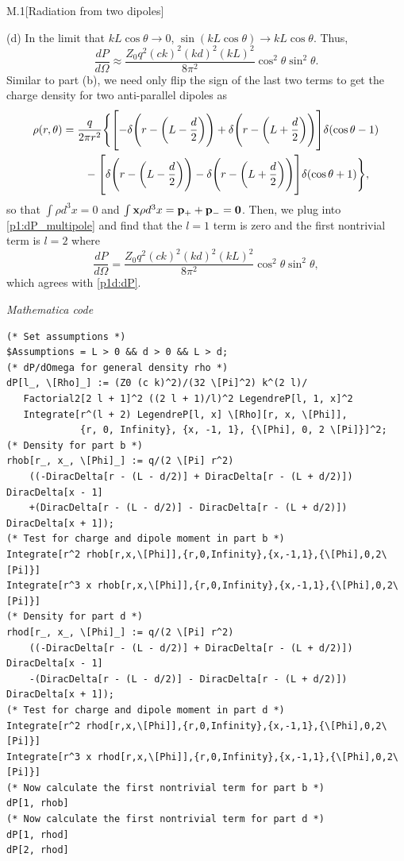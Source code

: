 \documentclass[12pt]{article}
\begin{document}
\begin{problem}{M.1}[Radiation from two dipoles]
\begin{solution}
(d) In the limit that $kL\cos\theta\to0$, $\sin(kL\cos\theta)\to kL\cos\theta$. 
Thus,
\begin{equation}\label{p1d:dP}
    \frac{dP}{d\Omega}\approx\frac{Z_0q^2(ck)^2(kd)^2(kL)^2}{8\pi^2}
    \cos^2\theta\sin^2\theta .
\end{equation}
Similar to part (b), we need only flip the sign of the last two terms to get 
the charge density for two anti-parallel dipoles as
\begin{align}
    \rho(r,\theta)
    &=\frac{q}{2\pi
    r^2}\Bigg\{\qty[-\delta\qty(r-\qty(L-\frac{d}{2}))+\delta\qty(r-\qty(L+\frac{d}{2}))]\delta\qty(\cos\theta-1)\notag\\
    &\qquad-\qty[\delta\qty(r-\qty(L-\frac{d}{2}))-\delta\qty(r-\qty(L+\frac{d}{2}))]\delta\qty(\cos\theta+1)\Bigg\},
\end{align}
so that $\int\rho d^3x=0$ and $\int\vb{x}\rho d^3x=\vb{p}_++\vb{p}_-=\vb{0}$.
Then, we plug into \cref{p1:dP_multipole} and find that the $l=1$ term is zero
and the first nontrivial term is $l=2$ where
\begin{equation}
    \frac{dP}{d\Omega}
    =\frac{Z_0q^2(ck)^2(kd)^2(kL)^2}{8\pi^2}\cos^2\theta\sin^2\theta, 
\end{equation}
which agrees with \cref{p1d:dP}.
\newpage
\begin{center}
    \textit{Mathematica code} 
\end{center}
\begin{lstlisting}[firstnumber=1]
(* Set assumptions *)
$Assumptions = L > 0 && d > 0 && L > d;
(* dP/dOmega for general density rho *)
dP[l_, \[Rho]_] := (Z0 (c k)^2)/(32 \[Pi]^2) k^(2 l)/
   Factorial2[2 l + 1]^2 ((2 l + 1)/l)^2 LegendreP[l, 1, x]^2
   Integrate[r^(l + 2) LegendreP[l, x] \[Rho][r, x, \[Phi]],
             {r, 0, Infinity}, {x, -1, 1}, {\[Phi], 0, 2 \[Pi]}]^2;
(* Density for part b *)
rhob[r_, x_, \[Phi]_] := q/(2 \[Pi] r^2)
    ((-DiracDelta[r - (L - d/2)] + DiracDelta[r - (L + d/2)]) DiracDelta[x - 1]
    +(DiracDelta[r - (L - d/2)] - DiracDelta[r - (L + d/2)]) DiracDelta[x + 1]);
(* Test for charge and dipole moment in part b *)
Integrate[r^2 rhob[r,x,\[Phi]],{r,0,Infinity},{x,-1,1},{\[Phi],0,2\[Pi]}]
Integrate[r^3 x rhob[r,x,\[Phi]],{r,0,Infinity},{x,-1,1},{\[Phi],0,2\[Pi]}]
(* Density for part d *)
rhod[r_, x_, \[Phi]_] := q/(2 \[Pi] r^2)
    ((-DiracDelta[r - (L - d/2)] + DiracDelta[r - (L + d/2)]) DiracDelta[x - 1]
    -(DiracDelta[r - (L - d/2)] - DiracDelta[r - (L + d/2)]) DiracDelta[x + 1]);
(* Test for charge and dipole moment in part d *)
Integrate[r^2 rhod[r,x,\[Phi]],{r,0,Infinity},{x,-1,1},{\[Phi],0,2\[Pi]}]
Integrate[r^3 x rhod[r,x,\[Phi]],{r,0,Infinity},{x,-1,1},{\[Phi],0,2\[Pi]}]
(* Now calculate the first nontrivial term for part b *)
dP[1, rhob]
(* Now calculate the first nontrivial term for part d *)
dP[1, rhod]
dP[2, rhod] 
\end{lstlisting}
\end{solution}
\end{problem}
\end{document}
